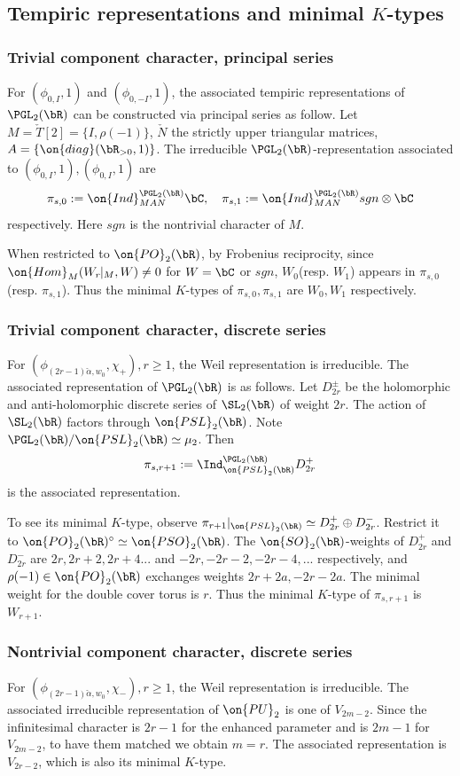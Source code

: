 \documentclass[12pt]{amsart}
\theoremstyle{remark}
\begin{document}
\subsection{Tempiric representations and minimal $K$-types}
\subsubsection{Trivial component character, principal series}
For $(\phi_{0,I},1)$ and $(\phi_{0,-I},1)$, 
the associated tempiric representations of $\PGL_2(\bR)$
can be constructed via principal series as follow.
Let $M=\check T[2]=\{I,\rho(-1)\}$, $\check N$ the strictly upper triangular matrices, $A=\{\on{diag}(\bR_{>0},1)\}$.
The irreducible $\PGL_2(\bR)$-representation
associated to $(\phi_{0,I},1),(\phi_{0,I},1)$ are
\[
\pi_{s,0}:=\on{Ind}^{\PGL_2(\bR)}_{MAN}\bC,\quad
\pi_{s,1}:=\on{Ind}^{\PGL_2(\bR)}_{MAN}sgn\otimes\bC
\]
respectively. Here $sgn$ is the nontrivial character of $M$.

When restricted to $\on{PO}_2(\bR)$, by Frobenius reciprocity, 
since $\on{Hom}_M(W_r\!\!\mid_M,W)\neq0$ for $W=\bC$ or $sgn$,
$W_0$(resp. $W_1$) appears in $\pi_{s,0}$(resp. $\pi_{s,1}$). 
Thus the minimal $K$-types of $\pi_{s,0},\pi_{s,1}$
are $W_0,W_1$ respectively.


\subsubsection{Trivial component character, discrete series}
For $(\phi_{(2r-1)\check\alpha,w_0},\chi_+),r\geq 1$,
the Weil representation is irreducible.
The associated representation of $\PGL_2(\bR)$ is as follows.
Let $D_{2r}^{\pm}$ be the holomorphic and anti-holomorphic 
discrete series of $\SL_2(\bR)$
of weight $2r$.
The action of $\SL_2(\bR)$ factors through $\on{PSL}_2(\bR)$.
Note $\PGL_2(\bR)/\on{PSL}_2(\bR)\simeq\mu_2$.
Then 
\[
\pi_{s,r+1}:=\Ind^{\PGL_2(\bR)}_{\on{PSL}_2(\bR)}D_{2r}^+
\]
is the associated representation.

To see its minimal $K$-type, observe
$\pi_{r+1}|_{\on{PSL}_2(\bR)}\simeq D_{2r}^+\oplus D_{2r}^-$.
Restrict it to $\on{PO}_2(\bR)^\circ\simeq\on{PSO}_2(\bR)$.
The $\on{SO}_2(\bR)$-weights of $D_{2r}^+$ and $D_{2r}^-$ 
are $2r, 2r+2, 2r+4...$ and $-2r, -2r-2, -2r-4,...$ respectively,
and $\rho(-1)\in\on{PO}_2(\bR)$ exchanges weights $2r+2a,-2r-2a$.
The minimal weight for the double cover torus is $r$.
Thus the minimal $K$-type of $\pi_{s,r+1}$ is $W_{r+1}$.

\subsubsection{Nontrivial component character, discrete series}
For $(\phi_{(2r-1)\check\alpha,w_0},\chi_-),r\geq 1$,
the Weil representation is irreducible.
The associated irreducible representation of $\on{PU}_2$ is one of $V_{2m-2}$.
Since the infinitesimal character is $2r-1$ for the enhanced parameter and is $2m-1$ for $V_{2m-2}$,
to have them matched we obtain $m=r$.
The associated representation is $V_{2r-2}$,
which is also its minimal $K$-type.
\end{document}
